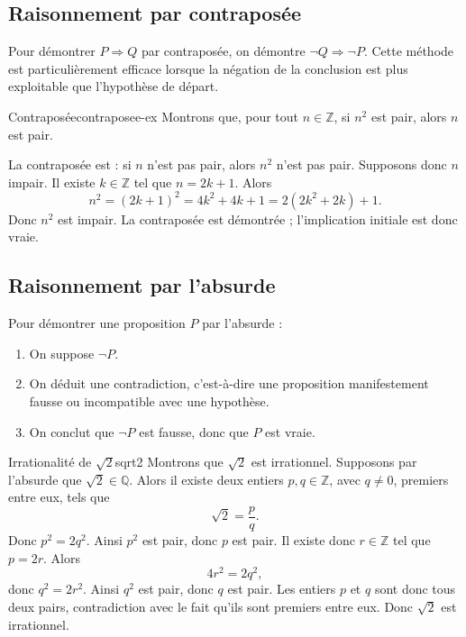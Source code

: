 \documentclass[11pt,a4paper]{article}
\newcommand{\Z}{\mathbb{Z}}
\newcommand{\Q}{\mathbb{Q}}
\begin{document}
\subsection{Raisonnement par contraposée}

\begin{methodebox}
Pour démontrer $P\Rightarrow Q$ par contraposée, on démontre $\neg Q\Rightarrow \neg P$. Cette méthode est particulièrement efficace lorsque la négation de la conclusion est plus exploitable que l'hypothèse de départ.
\end{methodebox}

\begin{exemplebox}{Contraposée}{contraposee-ex}
Montrons que, pour tout $n\in\Z$, si $n^2$ est pair, alors $n$ est pair.

La contraposée est : si $n$ n'est pas pair, alors $n^2$ n'est pas pair. Supposons donc $n$ impair. Il existe $k\in\Z$ tel que $n=2k+1$. Alors
\[
n^2=(2k+1)^2=4k^2+4k+1=2(2k^2+2k)+1.
\]
Donc $n^2$ est impair. La contraposée est démontrée ; l'implication initiale est donc vraie.
\end{exemplebox}

\subsection{Raisonnement par l'absurde}

\begin{methodebox}
Pour démontrer une proposition $P$ par l'absurde :
\begin{enumerate}
  \item On suppose $\neg P$.
  \item On déduit une contradiction, c'est-à-dire une proposition manifestement fausse ou incompatible avec une hypothèse.
  \item On conclut que $\neg P$ est fausse, donc que $P$ est vraie.
\end{enumerate}
\end{methodebox}

\begin{exemplebox}{Irrationalité de $\sqrt2$}{sqrt2}
Montrons que $\sqrt2$ est irrationnel. Supposons par l'absurde que $\sqrt2\in\Q$. Alors il existe deux entiers $p,q\in\Z$, avec $q\neq0$, premiers entre eux, tels que
\[
\sqrt2=\frac pq.
\]
Donc $p^2=2q^2$. Ainsi $p^2$ est pair, donc $p$ est pair. Il existe donc $r\in\Z$ tel que $p=2r$. Alors
\[
4r^2=2q^2,
\]
donc $q^2=2r^2$. Ainsi $q^2$ est pair, donc $q$ est pair. Les entiers $p$ et $q$ sont donc tous deux pairs, contradiction avec le fait qu'ils sont premiers entre eux. Donc $\sqrt2$ est irrationnel.
\end{exemplebox}
\end{document}
